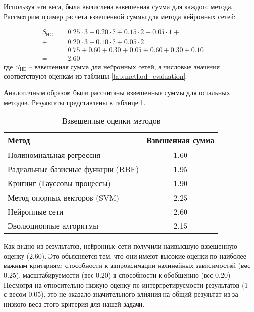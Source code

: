 Используя эти веса, была вычислена взвешенная сумма для каждого метода. Рассмотрим пример расчета взвешенной суммы для метода нейронных сетей:

\begin{equation}
    \begin{split}
        S_{НС} = & 0.25 \cdot 3 + 0.20 \cdot 3 + 0.15 \cdot 2 + 0.05 \cdot 1 + \\
        +        & 0.20 \cdot 3 + 0.10 \cdot 3 + 0.05 \cdot 2 =                \\
        =        & 0.75 + 0.60 + 0.30 + 0.05 + 0.60 + 0.30 + 0.10 =            \\
        =        & 2.60
    \end{split}
\end{equation}
где $S_{НС}$ -- взвешенная сумма для нейронных сетей, а числовые значения
соответствуют оценкам из таблицы \ref{tab:method_evaluation}.

Аналогичным образом были рассчитаны взвешенные суммы для остальных методов.
Результаты представлены в таблице \ref{tab:weighted_scores}.

\begin{table}[h]
    \centering
    \caption{Взвешенные оценки методов}
    \begin{tabular}{lc}
        \midrule
        Метод                             & Взвешенная сумма \\
        \midrule
        Полиномиальная регрессия          & 1.60             \\
        Радиальные базисные функции (RBF) & 1.95             \\
        Кригинг (Гауссовы процессы)       & 1.90             \\
        Метод опорных векторов (SVM)      & 2.25             \\
        Нейронные сети                    & 2.60             \\
        Эволюционные алгоритмы            & 2.15             \\
        \hline
    \end{tabular}
    \label{tab:weighted_scores}
\end{table}



Как видно из результатов, нейронные сети получили наивысшую взвешенную оценку
(2.60). Это объясняется тем, что они имеют высокие оценки по наиболее важным
критериям: способности к аппроксимации нелинейных зависимостей (вес 0.25),
масштабируемости (вес 0.20) и способности к обобщению (вес 0.20). Несмотря на
относительно низкую оценку по интерпретируемости результатов (1 с весом 0.05),
это не оказало значительного влияния на общий результат из-за низкого веса этого
критерия для нашей задачи.

